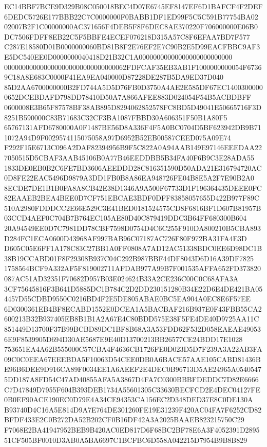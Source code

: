 \documentclass[UTF8,fontset=fandol,zihao=-4,a4paper]{ctexart}
\begin{document}
{{EC14BBF7BCE9D329B08C050018BEC4D07E6745EF8147EF6D1BAFCF4F2DEF6DEDC5726E177BBB22C7C0000000F0BABB1DF1ED99F5C5C591B77754BA02
02007B2F1C00000000AC371656F4DEB5F8F6DEC8AE370220F706000000E06B0DC7506FDFF8EB22C5F5BBFE4ECEF076218D315A57C8F6EFAA7BD7F577
C287E18580D01B0000000060BD81B8F2E76EF2E7C90B2E5D99EACFBBC9AF3E5DC540EE0D0000000040418D21B32C1A00000000000000000000000000
0000000000000000000000000000000062FDFCAF35EB3AB1F1000000000054F67369C18A8E683C0000F41EA9EA040000D87228DE287B5DA9ED37D040
85D2AA6700000000B2FD744A5D5D76FB0D3750A4AE2E585DF67EC14003000000652DCEBDAFD798DD78410D50A7A866AFEE883D024054F54B5ACBDBFF
0600008E3B65F87578BF38AB895D8294062852578FC8BD5D49041E50665716F3D8251B590000C83B71683C32CF3BA1087FBBD30A606351F50B1A80F5
65767131AFD6780000A0F1487BE56D8A336F4F5A0BC0704D5BF623942DB9B711072A94D9F0029574115075058A97D6952B52EB00587CEED075A09E74
F292F15E6713C096A2DAF82394956B9F5C822A0A94AAB149E97146EEEDAA227050515D5CBAF3AAB45106B0A77B46EEDDBB5B34FA40F6B9C3E28ADA55
1833DE0EB0B2C6FE7BD3606AEEDDD28C816351590D50ADA21E316794720AC0D8FE22EAC5496D9879A3DD1FB0B8A86EA948726FE04B8E5A2F7E90B2A0
8ECDE7DE1B1B0FA8A8CB42E38D1346A9A500F67733D1F196364435DEEE0FC82EAAEB2BEA4BEE0D7CF751EBCAE3BDF0DFF83858057655D422B977F89C
510A2980FDDDCC2E66E529C3E41BED0181524575CD8F6816BF1D607B81957B03CCD4AEF0C704B7B764EC105AE80D40C879419DDC3B64FF680300B604
20A94549EE0D7C7981DD78CBF7598D0754D4C6C255F910DA800210B5CBA893D284FC1ECA0600D43968AF997BAB96C07187AC726F80F972BA31FA4E3D
D605C05E6FF1A178C83C27BB1A0FF0808A7AD12AC51338BDC0EE6D98DC1B38B19CCABD01F8F29308B937C04C292B987BBF44DF8043D6D16A39DF7825
1758564BCF9A332AF5F819002711AFDAB977A99B7F001535AFFA652FD373820087AC51AD32351F70682D957B03E024624B33A2CE236C00C0C68AFA3A
3CF75645816F3B641D5885DC1B784C2D2DD230151280B34E22D6E4DE421BA054457D55CDBD9550C0216BD4F2E5DE805ABAE0BC5EA904A0EC8E6F57EE
6D0300361EB4BF8ECABD1552E0DCEA1A5BACBAF216B937E0F43FBB55CA2600213B32B937405EB8B1B1A2A67E4C80BDD575E38F5FE4DE40D9725AA11C
851449D13700F37B99BCBD89DC1BF8B68A3A53FDD62F532D058EAEAE490536E9F8539905D694D30AE5687E9E40D13700213BB26577CE24BDD17E1028
753651EA4A62B555000C57CBA4F4636CB1726FE0D023D5D7F239A3A22AB3FA09C0C0EEA67EEEBDA5F10063D54CEE0DB0A6BACE57AAE105CABD81436B
E96B6DEE9D916CA89F0034EE1A6AEEF2E4DEC0B96713D5AE24965A05405475DD187A8FD54C47AD40855AFA5A3867D4FA7C0300BBBFDEDDC7D82E6666
C7D47849D7955F604B393DEB1734A55601305C33630BECFCD2E4DEC04127FE0B0EF90ACE190EC0D79E4A34CE94353CA156EC2D348DED37E8C0DE130A
B93740D4C16A5E814D9A7E764DE301260FE19E31239F420AC04FA7F6252CD82BFDF433E2C0B272DA52B202CF0B16DF42A3A2025BAAEB823215750C29
F7068E2BA41947952BEB9B420AC0ED817D6F68BC2BF78E6A3F4052391D289551CF505BF0010D3AB0A5BA6697C1BCFBC6D558A042215D7954B9B8B829
}}
\end{document}
